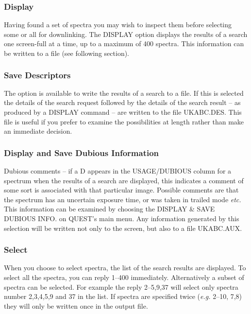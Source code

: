 \normalsize
\subsubsection{Display}
Having found a set of spectra you may wish to inspect them before selecting
some or all for downlinking.
The DISPLAY option displays the results of a search one screen-full at a time,
up to a maximum of 400 spectra.
This information can be written to a file (see following section).

\subsubsection {Save Descriptors}

The option is available to write the results of a search to a file.
If this is selected the details
of the search request
followed by the details of the search result -- as produced by a DISPLAY
command -- are written to the file UKABC.DES.
This file is useful if you prefer to examine the possibilities at length
rather than make an immediate decision.

\subsubsection {Display and Save Dubious Information}

Dubious comments -- if a D appears in the USAGE/DUBIOUS column for
a spectrum when
the results of a search are displayed,
this indicates a comment of some sort is associated with that particular image.
Possible comments are that the spectrum has an  uncertain exposure time, or
was taken in trailed mode {\it etc.}
This information can be examined by choosing
the DISPLAY \& SAVE DUBIOUS INFO. on QUEST's main menu.
Any information generated by this selection will be written not
only to the screen, but also to a file UKABC.AUX.

\subsubsection{Select}

When you choose to select spectra,
the list of the search results are displayed.
To select all the spectra, you can reply 1--400 immediately.
Alternatively a subset of spectra can be selected. For example the reply
2--5,9,37 will select only spectra number 2,3,4,5,9 and 37 in the list.
If spectra are specified twice ({\it e.g.} 2--10, 7,8) they will
only be written once in the output file.

